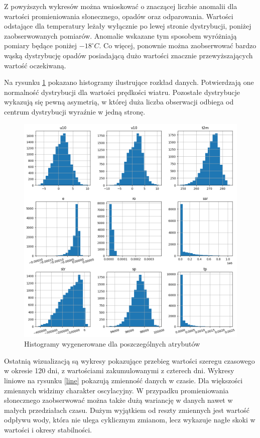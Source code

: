 Z powyższych wykresów można wnioskować o znaczącej liczbie anomalii dla wartości promieniowania słonecznego,
opadów oraz odparowania. Wartości odstające dla temperatury leżały wyłącznie po lewej stronie dystrybucji,
poniżej zaobserwowanych pomiarów. Anomalie wskazane tym sposobem wyróżniają pomiary będące poniżej $-18^\circ C$. Co więcej, ponownie można zaobserwować bardzo wąską dystrybucję opadów posiadającą dużo wartości znacznie
przewyższających wartość oczekiwaną. 

Na rysunku \ref{hist} pokazano histogramy ilustrujące rozkład danych. Potwierdzają one normalność dystrybucji
dla wartości prędkości wiatru. Pozostałe dystrybucje wykazują się pewną asymetrią, w której duża liczba 
obserwacji odbiega od centrum dystrybucji wyraźnie w jedną stronę. 

\begin{figure}[H]
    \centering
    \includegraphics[width=\textwidth]{images/hist.png}
    \caption{Histogramy wygenerowane dla poszczególnych atrybutów}
    \label{hist}
\end{figure}

Ostatnią wizualizacją są wykresy pokazujące przebieg wartości szeregu czasowego w okresie 120 dni, z 
wartościami zakumulowanymi z czterech dni. Wykresy liniowe na rysunku \ref{line} pokazują zmienność
danych w czasie. Dla większości zmiennych widzimy charakter oscylacyjny. W przypadku promieniowania 
słonecznego zaobserwować można także dużą wariancję w danych nawet w małych przedziałach czasu. 
Dużym wyjątkiem od reszty zmiennych jest wartość odpływu wody, która nie ulega cyklicznym zmianom, lecz
wykazuje nagłe skoki w wartości i okresy stabilności.


